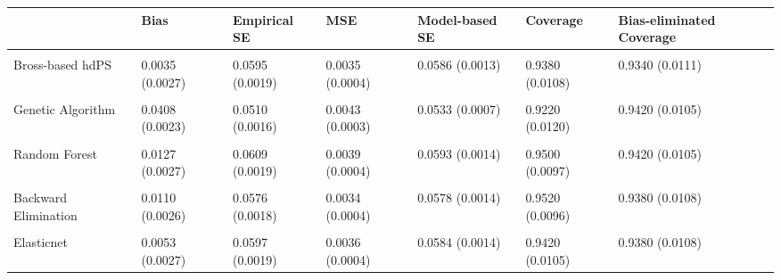 \begin{table}[!h]
\centering
\begin{tabular}{l|l|l|l|l|l|l}
\hline
  & Bias & Empirical SE & MSE & Model-based SE & Coverage & Bias-eliminated Coverage\\
\hline
\cellcolor{gray!10}{Kitchen sink} & \cellcolor{gray!10}{0.0025 (0.0029)} & \cellcolor{gray!10}{0.0656 (0.0021)} & \cellcolor{gray!10}{0.0043 (0.0005)} & \cellcolor{gray!10}{0.0623 (0.0014)} & \cellcolor{gray!10}{0.9340 (0.0111)} & \cellcolor{gray!10}{0.9320 (0.0113)}\\
\hline
Bross-based hdPS & 0.0035 (0.0027) & 0.0595 (0.0019) & 0.0035 (0.0004) & 0.0586 (0.0013) & 0.9380 (0.0108) & 0.9340 (0.0111)\\
\hline
\cellcolor{gray!10}{Hybrid hdPS} & \cellcolor{gray!10}{0.0049 (0.0025)} & \cellcolor{gray!10}{0.0564 (0.0018)} & \cellcolor{gray!10}{0.0032 (0.0003)} & \cellcolor{gray!10}{0.0564 (0.0012)} & \cellcolor{gray!10}{0.9460 (0.0101)} & \cellcolor{gray!10}{0.9340 (0.0111)}\\
\hline
Genetic Algorithm & 0.0408 (0.0023) & 0.0510 (0.0016) & 0.0043 (0.0003) & 0.0533 (0.0007) & 0.9220 (0.0120) & 0.9420 (0.0105)\\
\hline
\cellcolor{gray!10}{XGBoost} & \cellcolor{gray!10}{0.0259 (0.0023)} & \cellcolor{gray!10}{0.0507 (0.0016)} & \cellcolor{gray!10}{0.0032 (0.0003)} & \cellcolor{gray!10}{0.0531 (0.0009)} & \cellcolor{gray!10}{0.9620 (0.0086)} & \cellcolor{gray!10}{0.9400 (0.0106)}\\
\hline
Random Forest & 0.0127 (0.0027) & 0.0609 (0.0019) & 0.0039 (0.0004) & 0.0593 (0.0014) & 0.9500 (0.0097) & 0.9420 (0.0105)\\
\hline
\cellcolor{gray!10}{Forward Selection} & \cellcolor{gray!10}{0.0108 (0.0024)} & \cellcolor{gray!10}{0.0537 (0.0017)} & \cellcolor{gray!10}{0.0030 (0.0003)} & \cellcolor{gray!10}{0.0555 (0.0011)} & \cellcolor{gray!10}{0.9500 (0.0097)} & \cellcolor{gray!10}{0.9460 (0.0101)}\\
\hline
Backward Elimination & 0.0110 (0.0026) & 0.0576 (0.0018) & 0.0034 (0.0004) & 0.0578 (0.0014) & 0.9520 (0.0096) & 0.9380 (0.0108)\\
\hline
\cellcolor{gray!10}{LASSO} & \cellcolor{gray!10}{0.0060 (0.0026)} & \cellcolor{gray!10}{0.0587 (0.0019)} & \cellcolor{gray!10}{0.0035 (0.0004)} & \cellcolor{gray!10}{0.0580 (0.0014)} & \cellcolor{gray!10}{0.9420 (0.0105)} & \cellcolor{gray!10}{0.9420 (0.0105)}\\
\hline
Elasticnet & 0.0053 (0.0027) & 0.0597 (0.0019) & 0.0036 (0.0004) & 0.0584 (0.0014) & 0.9420 (0.0105) & 0.9380 (0.0108)\\
\hline
\end{tabular}
\end{table}
